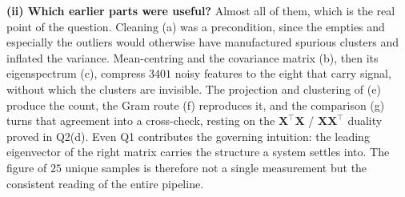 \documentclass[12pt,a4paper]{article}
\theoremstyle{definition}
\newcommand{\Xb}{\mathbf{X}}
\newcommand{\T}{^{\!\top}}
\begin{document}
\textbf{(ii) Which earlier parts were useful?} Almost all of them, which is the real point of the
question. Cleaning (a) was a precondition, since the empties and especially the outliers would
otherwise have manufactured spurious clusters and inflated the variance. Mean-centring and the
covariance matrix (b), then its eigenspectrum (c), compress $3401$ noisy features to the eight that
carry signal, without which the clusters are invisible. The projection and clustering of (e) produce
the count, the Gram route (f) reproduces it, and the comparison (g) turns that agreement into a
cross-check, resting on the $\Xb\T\Xb$ / $\Xb\Xb\T$ duality proved in Q2(d). Even Q1 contributes the
governing intuition: the leading eigenvector of the right matrix carries the structure a system
settles into. The figure of $25$ unique samples is therefore not a single measurement but the
consistent reading of the entire pipeline.
\end{document}
